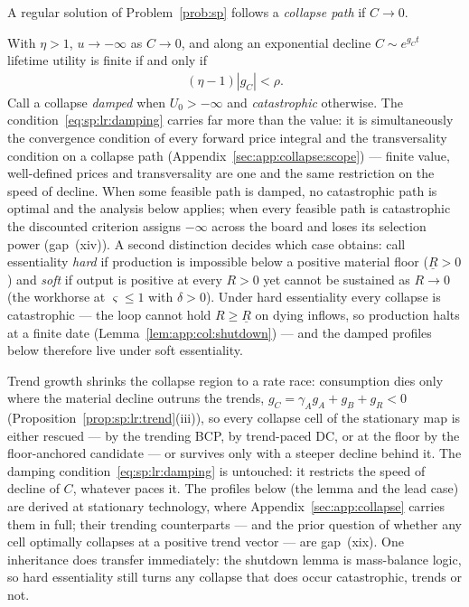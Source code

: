 \begin{definition}\label{def:sp:lr:collapse}
A regular solution of Problem~\ref{prob:sp} follows a \emph{collapse path} if $C\to0$.
\end{definition}

 With $\eta>1$, $u\to-\infty$ as $C\to0$, and
along an exponential decline $C\sim e^{g_Ct}$ lifetime utility is finite if and only if
\begin{align}
\left(\eta-1\right)\left|g_C\right|<\rho .
\label{eq:sp:lr:damping}
\end{align}
Call a collapse \emph{damped} when $U_0>-\infty$ and \emph{catastrophic} otherwise. The
condition~\eqref{eq:sp:lr:damping} carries far more than the value: it is simultaneously the
convergence condition of every forward price integral and the transversality condition on a
collapse path (Appendix~\ref{sec:app:collapse:scope}) --- finite value, well-defined prices
and transversality are one and the same restriction on the speed of decline. When some
feasible path is damped, no catastrophic path is optimal and the analysis below applies;
when every feasible path is catastrophic the discounted criterion assigns $-\infty$ across
the board and loses its selection power (gap~(xiv)). A second distinction decides which case
obtains: call essentiality \emph{hard} if production is impossible below a positive material
floor ($\underline R>0$) and \emph{soft} if output is positive at every $R>0$ yet cannot be
sustained as $R\to0$ (the workhorse at $\varsigma\le1$ with $\delta>0$). Under hard
essentiality every collapse is catastrophic --- the loop cannot hold $R\ge\underline R$ on
dying inflows, so production halts at a finite date
(Lemma~\ref{lem:app:col:shutdown}) --- and the damped profiles below therefore live under
soft essentiality.

 Trend growth shrinks the collapse region to a rate race:
consumption dies only where the material decline outruns the trends,
$g_C=\gamma_Ag_A+g_B+g_R<0$ (Proposition~\ref{prop:sp:lr:trend}(iii)), so every collapse
cell of the stationary map is either rescued --- by the trending BCP, by trend-paced DC, or
at the floor by the floor-anchored candidate --- or survives only with a steeper decline
behind it. The damping condition~\eqref{eq:sp:lr:damping} is untouched: it restricts the
speed of decline of $C$, whatever paces it. The profiles below (the lemma and the lead case)
are derived at stationary technology, where Appendix~\ref{sec:app:collapse} carries them in
full; their trending counterparts --- and the prior question of whether any cell optimally
collapses at a positive trend vector --- are gap~(xix). One inheritance does transfer
immediately: the shutdown lemma is mass-balance logic, so hard essentiality still turns any
collapse that does occur catastrophic, trends or not.

